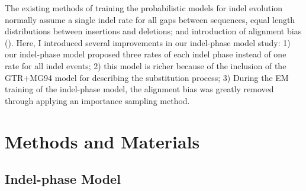 The existing methods of training the probabilistic models for indel evolution normally assume a single indel rate for all gaps between sequences, equal length distributions between insertions and deletions; and introduction of alignment bias (\cite{holmes2005using, lunter2007probabilistic, cartwright2009problems}). Here, I introduced several improvements in our indel-phase model study: 1) our indel-phase model proposed three rates of each indel phase instead of one rate for all indel events; 2) this model is richer because of the inclusion of the GTR+MG94 model for describing the substitution process; 3) During the EM training of the indel-phase model, the alignment bias was greatly removed through applying an importance sampling method. 


\section{Methods and Materials} 
\subsection{Indel-phase Model}

